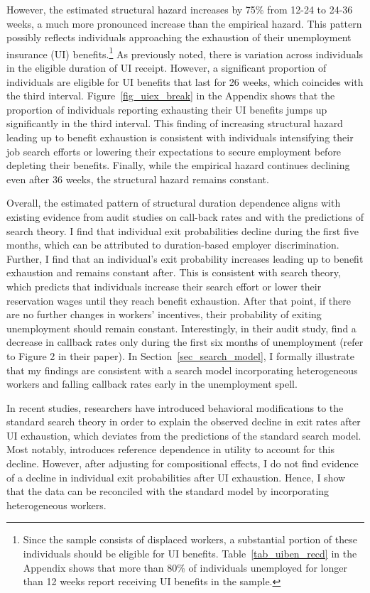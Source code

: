 \documentclass{div}
\newcommand{\EstHazTwotoThree}{75}
\begin{document}
However, the estimated structural hazard increases by \EstHazTwotoThree\% from 12-24 to 24-36 weeks, a much more pronounced increase than the empirical hazard. This pattern possibly reflects individuals approaching the exhaustion of their unemployment insurance (UI) benefits.\footnote{Since the sample consists of displaced workers, a substantial portion of these individuals should be eligible for UI benefits. Table~\ref{tab_uiben_recd} in the  Appendix shows that more than 80\% of individuals unemployed for longer than 12 weeks report receiving UI benefits in the sample.} As previously noted, there is variation across individuals in the eligible duration of UI receipt. However, a significant proportion of individuals are eligible for UI benefits that last for 26 weeks, which coincides with the third interval. Figure~\ref{fig_uiex_break} in the  Appendix shows that the proportion of individuals reporting exhausting their UI benefits jumps up significantly in the third interval. This finding of increasing structural hazard leading up to benefit exhaustion is consistent with individuals intensifying their job search efforts or lowering their expectations to secure employment before depleting their benefits. Finally, while the empirical hazard continues declining even after 36 weeks, the structural hazard remains constant.

Overall, the estimated pattern of structural duration dependence aligns with existing evidence from audit studies on call-back rates and with the predictions of search theory. I find that individual exit probabilities decline during the first five months, which can be attributed to duration-based employer discrimination. Further, I find that an individual's exit probability increases leading up to benefit exhaustion and remains constant after. This is consistent with search theory, which predicts that individuals increase their search effort or lower their reservation wages until they reach benefit exhaustion. After that point, if there are no further changes in workers' incentives, their probability of exiting unemployment should remain constant. Interestingly, in their audit study, \cite{KroftEtAl2013} find a decrease in callback rates only during the first six months of unemployment (refer to Figure 2 in their paper). In Section~\ref{sec_search_model}, I formally illustrate that my findings are consistent with a search model incorporating heterogeneous workers and falling callback rates early in the unemployment spell.

In recent studies, researchers have introduced behavioral modifications to the standard search theory in order to explain the observed decline in exit rates after UI exhaustion, which deviates from the predictions of the standard search model. Most notably, \cite{DellaVignaEtAl2021} introduces reference dependence in utility to account for this decline. However, after adjusting for compositional effects, I do not find evidence of a decline in individual exit probabilities after UI exhaustion. Hence, I show that the data can be reconciled with the standard model by incorporating heterogeneous workers.
\end{document}
